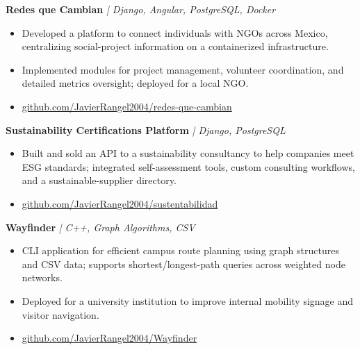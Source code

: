 \documentclass[11pt, letterpaper]{article}
\newcommand{\project}[2]{%
  \noindent\textbf{#1} \hspace{4pt} \textit{| #2}%
}
\newenvironment{cvlist}{%
  \begin{itemize}[
    leftmargin=1.4em,
    itemsep=1.5pt,
    topsep=3pt,
    parsep=0pt
  ]
}{%
  \end{itemize}%
}
\begin{document}
\vspace{4pt}

\project{Redes que Cambian}%
        {Django, Angular, PostgreSQL, Docker}

\begin{cvlist}
  \item Developed a platform to connect individuals with NGOs across
        Mexico, centralizing social-project information on a containerized
        infrastructure.
  \item Implemented modules for project management, volunteer
        coordination, and detailed metrics oversight; deployed for a
        local NGO.
  \item \href{https://github.com/JavierRangel2004/redes-que-cambian}{github.com/JavierRangel2004/redes-que-cambian}
\end{cvlist}

\vspace{4pt}

\project{Sustainability Certifications Platform}%
        {Django, PostgreSQL}

\begin{cvlist}
  \item Built and sold an API to a sustainability consultancy to help
        companies meet ESG standards; integrated self-assessment tools,
        custom consulting workflows, and a sustainable-supplier directory.
  \item \href{https://github.com/JavierRangel2004/sustentabilidad}{github.com/JavierRangel2004/sustentabilidad}
\end{cvlist}

\vspace{4pt}

\project{Wayfinder}%
        {C++, Graph Algorithms, CSV}

\begin{cvlist}
  \item CLI application for efficient campus route planning using graph
        structures and CSV data; supports shortest/longest-path queries
        across weighted node networks.
  \item Deployed for a university institution to improve internal
        mobility signage and visitor navigation.
  \item \href{https://github.com/JavierRangel2004/Wayfinder}{github.com/JavierRangel2004/Wayfinder}
\end{cvlist}

\end{document}

